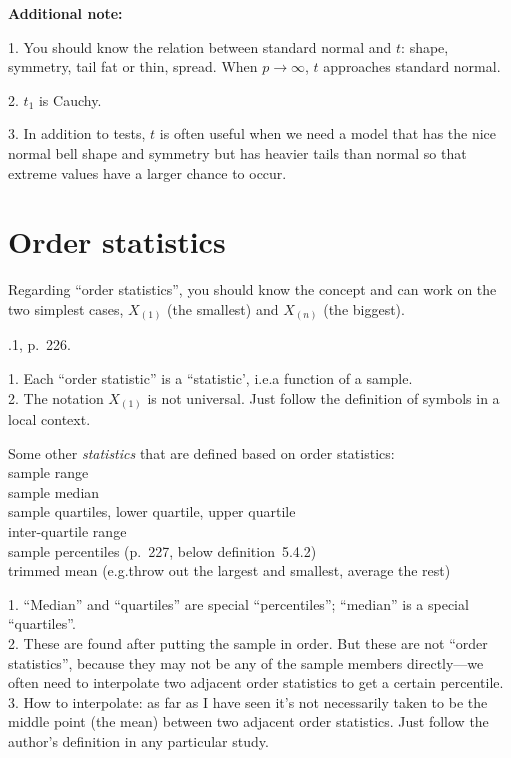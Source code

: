 \documentclass[12pt]{article}
\begin{document}
\textbf{Additional note:}

1. You should know the relation between standard normal and $t$:
shape, symmetry, tail fat or thin, spread.
When $p \to \infty$, $t$ approaches standard normal.

2. $t_1$ is Cauchy.

3. In addition to tests, $t$ is often useful when we need a model
that has the nice normal bell shape and symmetry but has
heavier tails than normal so that extreme values have a larger chance to
occur.



\section{Order statistics}

Regarding ``order statistics'', you should know the concept
and can work on the two simplest cases, $X_{(1)}$ (the smallest)
and $X_{(n)}$ (the biggest).

.1, p.~226.

\alert
1. Each ``order statistic'' is a ``statistic',
i.e.\@ a function of a sample.\\
2. The notation $X_{(1)}$ is not universal.
Just follow the definition of symbols in a local context.

Some other \emph{statistics} that are defined based on order statistics:\\
sample range\\
sample median\\
sample quartiles, lower quartile, upper quartile\\
inter-quartile range\\
sample percentiles (p.~227, below definition~5.4.2)\\
trimmed mean (e.g.\@ throw out the largest and smallest, average the
rest)

\alert
1. ``Median'' and ``quartiles'' are special ``percentiles'';
    ``median'' is a special ``quartiles''.\\
2. These are found after putting the sample in order.
    But these are not ``order statistics'', because
    they may not be any of the sample members directly---we often need
    to interpolate two adjacent order statistics to get a certain
    percentile.\\
3. How to interpolate: as far as I have seen it's not necessarily taken
    to be the middle point (the mean) between two adjacent order
    statistics. Just follow the author's definition in any particular
    study.
\end{document}
